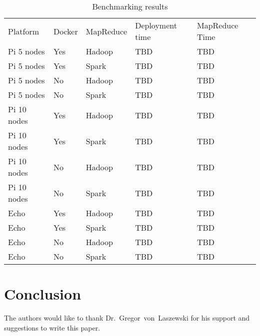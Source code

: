 \begin{table}[hbt]
\centering
\caption{Benchmarking results}
\label{t:results-table}
\begin{tabular}{lllll}
Platform    & Docker & MapReduce & Deployment time & MapReduce Time \\
Pi 5 nodes  & Yes    & Hadoop    & TBD             & TBD            \\
Pi 5 nodes  & Yes    & Spark     & TBD             & TBD            \\
Pi 5 nodes  & No     & Hadoop    & TBD             & TBD            \\
Pi 5 nodes  & No     & Spark     & TBD             & TBD            \\
Pi 10 nodes & Yes    & Hadoop    & TBD             & TBD            \\
Pi 10 nodes & Yes    & Spark     & TBD             & TBD            \\
Pi 10 nodes & No     & Hadoop    & TBD             & TBD            \\
Pi 10 nodes & No     & Spark     & TBD             & TBD            \\
Echo        & Yes    & Hadoop    & TBD             & TBD            \\
Echo        & Yes    & Spark     & TBD             & TBD            \\
Echo        & No     & Hadoop    & TBD             & TBD            \\
Echo        & No     & Spark     & TBD             & TBD
\end{tabular}
\end{table}



\section{Conclusion}



\begin{acks}

  The authors would like to thank Dr.~Gregor~von~Laszewski for his
  support and suggestions to write this paper.

\end{acks}



